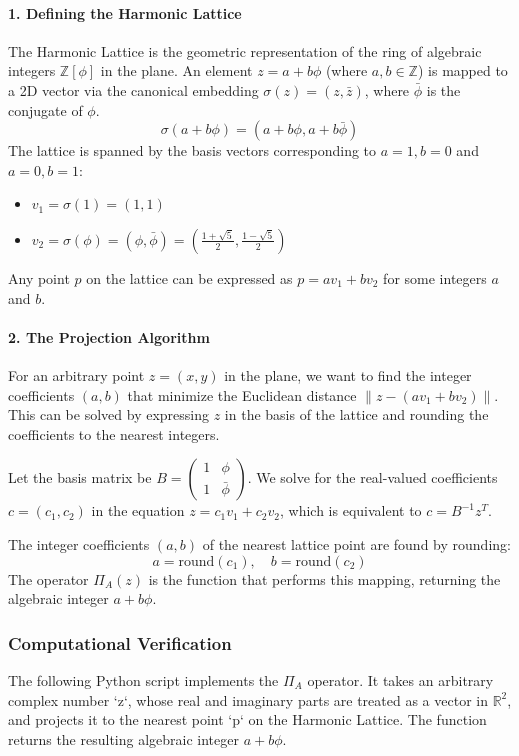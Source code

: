\paragraph{1. Defining the Harmonic Lattice}
The Harmonic Lattice is the geometric representation of the ring of algebraic integers $\mathbb{Z}[\phi]$ in the plane. An element $z = a + b\phi$ (where $a, b \in \mathbb{Z}$) is mapped to a 2D vector via the canonical embedding $\sigma(z) = (z, \bar{z})$, where $\bar{\phi}$ is the conjugate of $\phi$.
$$\sigma(a+b\phi) = (a+b\phi, a+b\bar{\phi})$$
The lattice is spanned by the basis vectors corresponding to $a=1, b=0$ and $a=0, b=1$:
\begin{itemize}
    \item $v_1 = \sigma(1) = (1, 1)$
    \item $v_2 = \sigma(\phi) = (\phi, \bar{\phi}) = (\frac{1+\sqrt{5}}{2}, \frac{1-\sqrt{5}}{2})$
\end{itemize}
Any point $p$ on the lattice can be expressed as $p = a v_1 + b v_2$ for some integers $a$ and $b$.

\paragraph{2. The Projection Algorithm}
For an arbitrary point $z = (x, y)$ in the plane, we want to find the integer coefficients $(a,b)$ that minimize the Euclidean distance $\|z - (a v_1 + b v_2)\|$. This can be solved by expressing $z$ in the basis of the lattice and rounding the coefficients to the nearest integers.

Let the basis matrix be $B = \begin{pmatrix} 1 & \phi \\ 1 & \bar{\phi} \end{pmatrix}$. We solve for the real-valued coefficients $c = (c_1, c_2)$ in the equation $z = c_1 v_1 + c_2 v_2$, which is equivalent to $c = B^{-1} z^T$.

The integer coefficients $(a,b)$ of the nearest lattice point are found by rounding:
$$a = \text{round}(c_1), \quad b = \text{round}(c_2)$$
The operator $\Pi_A(z)$ is the function that performs this mapping, returning the algebraic integer $a+b\phi$.

\subsubsection*{Computational Verification}
The following Python script implements the $\Pi_A$ operator. It takes an arbitrary complex number `z`, whose real and imaginary parts are treated as a vector in $\mathbb{R}^2$, and projects it to the nearest point `p` on the Harmonic Lattice. The function returns the resulting algebraic integer $a+b\phi$.

